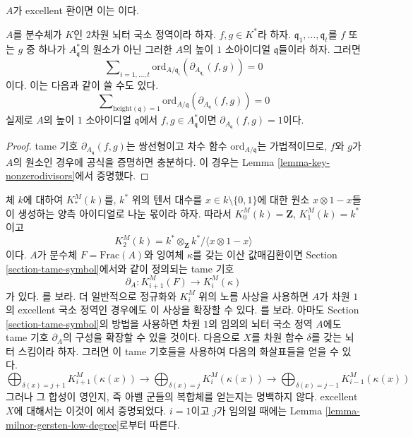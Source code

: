 \begin{lemma}[핵심 보조정리]
\label{lemma-milnor-gersten-low-degree}
\begin{reference}
$A$가 excellent 환이면 이는 \cite[Proposition 1]{Kato-Milnor-K}이다.
\end{reference}
$A$를 분수체가 $K$인 $2$차원 뇌터 국소 정역이라 하자.
$f, g \in K^*$라 하자. $\mathfrak q_1, \ldots, \mathfrak q_t$를
$f$ 또는 $g$ 중 하나가 $A^*_{\mathfrak q}$의 원소가 아닌 그러한
$A$의 높이 $1$ 소아이디얼 $\mathfrak q$들이라 하자. 그러면
$$
\sum\nolimits_{i = 1, \ldots, t}
\text{ord}_{A/\mathfrak q_i}(\partial_{A_{\mathfrak q_i}}(f, g))
=
0
$$
이다. 이는 다음과 같이 쓸 수도 있다.
$$
\sum\nolimits_{\text{height}(\mathfrak q) = 1}
\text{ord}_{A/\mathfrak q}(\partial_{A_{\mathfrak q}}(f, g))
=
0
$$
실제로 $A$의 높이 $1$ 소아이디얼 $\mathfrak q$에서
$f, g \in A^*_{\mathfrak q}$이면
$\partial_{A_{\mathfrak q}}(f, g) = 1$이다.
\end{lemma}

\begin{proof}
tame 기호 $\partial_{A_{\mathfrak q}}(f, g)$는 쌍선형이고 차수 함수
$\text{ord}_{A/\mathfrak q}$는 가법적이므로, $f$와 $g$가 $A$의 원소인
경우에 공식을 증명하면 충분하다. 이 경우는 Lemma
\ref{lemma-key-nonzerodivisors}에서 증명했다.
\end{proof}

\begin{remark}[밀너 K-이론]
\label{remark-gersten-complex-milnor}
체 $k$에 대하여 $K^M_*(k)$를, $k^*$ 위의 텐서 대수를
$x \in k \setminus \{0, 1\}$에 대한 원소 $x \otimes 1 - x$들이 생성하는
양측 아이디얼로 나눈 몫이라 하자. 따라서
$K^M_0(k) = \mathbf{Z}$, $K_1^M(k) = k^*$이고
$$
K^M_2(k) = k^* \otimes_\mathbf{Z} k^* / \langle x \otimes 1 - x \rangle
$$
이다. $A$가 분수체 $F = \text{Frac}(A)$와 잉여체 $\kappa$를 갖는
이산 값매김환이면 Section \ref{section-tame-symbol}에서와 같이 정의되는
tame 기호
$$
\partial_A : K_{i + 1}^M(F) \to K_i^M(\kappa)
$$
가 있다. \cite{Kato-Milnor-K}를 보라. 더 일반적으로 정규화와
$K_i^M$ 위의 노름 사상을 사용하면 $A$가 차원 $1$의 excellent 국소
정역인 경우에도 이 사상을 확장할 수 있다. \cite{Kato-Milnor-K}를 보라.
아마도 Section \ref{section-tame-symbol}의 방법을 사용하면 차원 $1$의
임의의 뇌터 국소 정역 $A$에도 tame 기호 $\partial_A$의 구성을
확장할 수 있을 것이다. 다음으로 $X$를 차원 함수 $\delta$를 갖는
뇌터 스킴이라 하자. 그러면 이 tame 기호들을 사용하여 다음의
화살표들을 얻을 수 있다.
$$
\bigoplus\nolimits_{\delta(x) = j + 1} K^M_{i + 1}(\kappa(x))
\longrightarrow
\bigoplus\nolimits_{\delta(x) = j} K^M_i(\kappa(x))
\longrightarrow
\bigoplus\nolimits_{\delta(x) = j - 1} K^M_{i - 1}(\kappa(x))
$$
그러나 그 합성이 영인지, 즉 아벨 군들의 복합체를 얻는지는 명백하지
않다. excellent $X$에 대해서는 이것이 \cite{Kato-Milnor-K}에서
증명되었다. $i = 1$이고 $j$가 임의일 때에는 Lemma
\ref{lemma-milnor-gersten-low-degree}로부터 따른다.
\end{remark}




















